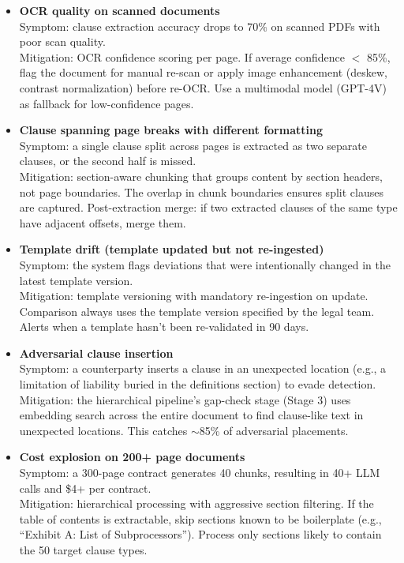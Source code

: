 \begin{itemize}
  \item \textbf{OCR quality on scanned documents}\\
    Symptom: clause extraction accuracy drops to 70\% on scanned PDFs with poor scan quality.\\
    Mitigation: OCR confidence scoring per page. If average confidence $<$ 85\%, flag the document for manual re-scan or apply image enhancement (deskew, contrast normalization) before re-OCR. Use a multimodal model (GPT-4V) as fallback for low-confidence pages.

  \item \textbf{Clause spanning page breaks with different formatting}\\
    Symptom: a single clause split across pages is extracted as two separate clauses, or the second half is missed.\\
    Mitigation: section-aware chunking that groups content by section headers, not page boundaries. The overlap in chunk boundaries ensures split clauses are captured. Post-extraction merge: if two extracted clauses of the same type have adjacent offsets, merge them.

  \item \textbf{Template drift (template updated but not re-ingested)}\\
    Symptom: the system flags deviations that were intentionally changed in the latest template version.\\
    Mitigation: template versioning with mandatory re-ingestion on update. Comparison always uses the template version specified by the legal team. Alerts when a template hasn't been re-validated in 90 days.

  \item \textbf{Adversarial clause insertion}\\
    Symptom: a counterparty inserts a clause in an unexpected location (e.g., a limitation of liability buried in the definitions section) to evade detection.\\
    Mitigation: the hierarchical pipeline's gap-check stage (Stage 3) uses embedding search across the entire document to find clause-like text in unexpected locations. This catches $\sim$85\% of adversarial placements.

  \item \textbf{Cost explosion on 200+ page documents}\\
    Symptom: a 300-page contract generates 40 chunks, resulting in 40+ LLM calls and \$4+ per contract.\\
    Mitigation: hierarchical processing with aggressive section filtering. If the table of contents is extractable, skip sections known to be boilerplate (e.g., ``Exhibit A: List of Subprocessors''). Process only sections likely to contain the 50 target clause types.
\end{itemize}

